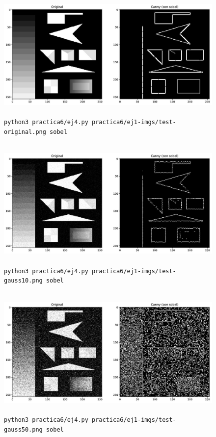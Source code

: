\documentclass[11pt, spanish]{article}
\begin{document}
\begin{figure}[H]
\centering
    \includegraphics[height=6.5cm]{informe-imgs/ej4-sobel-test-original.jpg}
    \caption{\texttt{python3 practica6/ej4.py practica6/ej1-imgs/test-original.png sobel}}
\end{figure}

\begin{figure}[H]
\centering
    \includegraphics[height=6.5cm]{informe-imgs/ej4-sobel-test-gauss10.jpg}
    \caption{\texttt{python3 practica6/ej4.py practica6/ej1-imgs/test-gauss10.png sobel}}
\end{figure}

\begin{figure}[H]
\centering
    \includegraphics[height=6.5cm]{informe-imgs/ej4-sobel-test-gauss50.jpg}
    \caption{\texttt{python3 practica6/ej4.py practica6/ej1-imgs/test-gauss50.png sobel}}
\end{figure}
\end{document}
